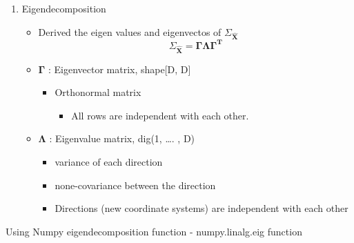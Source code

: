 \documentclass[11pt]{article}
\providecommand{\tightlist}{%
      \setlength{\itemsep}{0pt}\setlength{\parskip}{0pt}}
\begin{document}
    \begin{enumerate}
\def\labelenumi{\arabic{enumi}.}
\setcounter{enumi}{3}
\tightlist
\item
  Eigendecomposition

  \begin{itemize}
  \item
    Derived the eigen values and eigenvectos of
    \(\Sigma_{\hat{\mathbf{X}}}\) \[
    \Sigma_{\hat{\mathbf{X}}} = \mathbf{\Gamma}\mathbf{\Lambda}\mathbf{\Gamma^T}
    \]
  \item
    \(\mathbf{\Gamma}\) : Eigenvector matrix, shape{[}D, D{]}

    \begin{itemize}
    \tightlist
    \item
      Orthonormal matrix

      \begin{itemize}
      \tightlist
      \item
        All rows are independent with each other.
      \end{itemize}
    \end{itemize}
  \item
    \(\mathbf{\Lambda}\) : Eigenvalue matrix, dig(1, \ldots. , D)

    \begin{itemize}
    \tightlist
    \item
      variance of each direction
    \item
      none-covariance between the direction
    \item
      Directions (new coordinate systems) are independent with each
      other
    \end{itemize}
  \end{itemize}
\end{enumerate}

    Using Numpy eigendecomposition function - numpy.linalg.eig function
\end{document}
